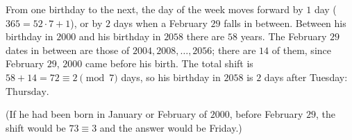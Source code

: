 From one birthday to the next, the day of the week moves forward by $1$ day ($365=52\cdot7+1$), or by $2$ days when a February $29$ falls in between. Between his birthday in $2000$ and his birthday in $2058$ there are $58$ years. The February $29$ dates in between are those of $2004,2008,\dots,2056$; there are $14$ of them, since February $29$, $2000$ came before his birth. The total shift is $58+14=72\equiv2\pmod7$ days, so his birthday in $2058$ is $2$ days after Tuesday: $\boxed{\text{Thursday}}$.

(If he had been born in January or February of $2000$, before February $29$, the shift would be $73\equiv3$ and the answer would be Friday.)

